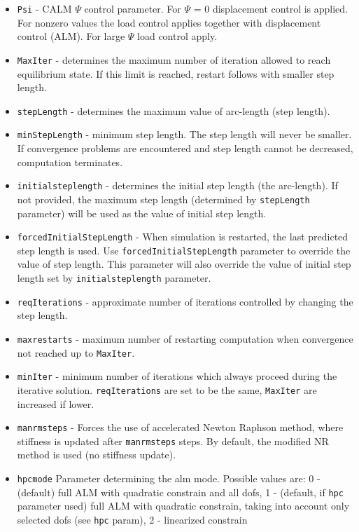 \documentclass[a4paper]{article}
\newcommand{\param}[1]{\texttt{#1}} %
\begin{document}
\begin{itemize}
\item \param{Psi} - CALM $\Psi$ control parameter. For $\Psi$ = 0
displacement control is applied. For nonzero values the load control
applies together with displacement control (ALM). For large $\Psi$
load control apply.
\item \param{MaxIter} - determines the maximum number of iteration allowed to
reach equilibrium state. If this limit is reached, restart follows
with smaller step length.
\item \param{stepLength} - determines the maximum value of arc-length (step length).
\item \param{min\-Step\-Le\-ngth} - minimum step length. The step length will never be
smaller. If convergence problems are encountered and step length cannot
be decreased, computation terminates.
\item \param{initialsteplength} - determines the initial step length (the arc-length). If not provided, the maximum step length (determined by \param{stepLength} parameter) will be used as the value of initial step length. 
\item \param{forcedInitialStepLength} - When simulation is restarted, the last predicted step length is used. Use \param{forcedInitialStepLength} parameter to override the value of step length. This parameter will also override the value of initial step length set by \param{initialsteplength} parameter.
\item \param{reqIterations} - approximate number of iterations controlled by changing the step length.
\item \param{maxrestarts} - maximum number of restarting computation when convergence not reached up to \param{MaxIter}.
\item \param{minIter} - minimum number of iterations which always proceed during the iterative solution. \param{reqIterations} are set to be the same, \param{MaxIter} are increased if lower.
\item \param{manrmsteps} - Forces the use of accelerated
Newton Raphson met\-hod, where stiffness is updated after
\param{manrmsteps} steps. By default, the modified NR
method is used (no stiffness update).
\item \param{hpcmode} Parameter determining the alm mode.
Possible values are: 0 - (default) full ALM with quadratic constrain and
all dofs, 1 - (default, if \param{hpc} parameter used) full ALM with quadratic constrain, taking into account
only selected dofs (see \param{hpc} param), 2 - linearized constrain

\end{itemize}
\end{document}
